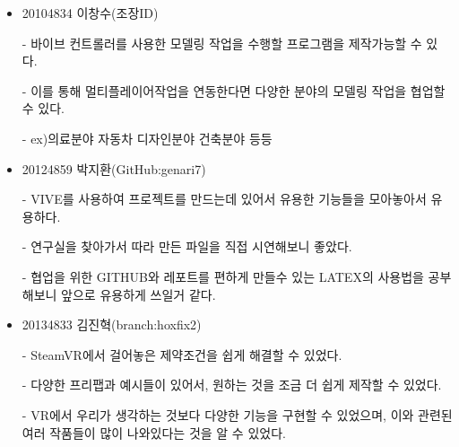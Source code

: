 \documentclass{report}
\begin{document}
    \begin{itemize}
    
    \item {20104834 이창수(조장ID)}
    \item [ -]바이브 컨트롤러를 사용한 모델링 작업을 수행할 프로그램을 제작가능할 수 있다.
    \item [ -]이를 통해 멀티플레이어작업을 연동한다면 다양한 분야의 모델링 작업을 협업할 수 있다.
    \item [ -]ex)의료분야 자동차 디자인분야 건축분야 등등

    
    \item {20124859 박지환(GitHub:genari7)}
    \item [ -]VIVE를 사용하여 프로젝트를 만드는데 있어서 유용한 기능들을 모아놓아서 유용하다.
    \item [ -]연구실을 찾아가서 따라 만든 파일을 직접 시연해보니 좋았다.
    \item [ -]협업을 위한 GITHUB와 레포트를 편하게 만들수 있는 LATEX의 사용법을 공부해보니 앞으로 유용하게 쓰일거 같다.
    
    \item {20134833 김진혁(branch:hoxfix2)}
    \item [ -]SteamVR에서 걸어놓은 제약조건을 쉽게 해결할 수 있었다.
    \item [ -]다양한 프리팹과 예시들이 있어서, 원하는 것을 조금 더 쉽게 제작할 수 있었다.
    \item [ -]VR에서 우리가 생각하는 것보다 다양한 기능을 구현할 수 있었으며, 이와 관련된 여러 작품들이 많이 나와있다는 것을 알 수 있었다.

    \end{itemize}

    
\end{document}
